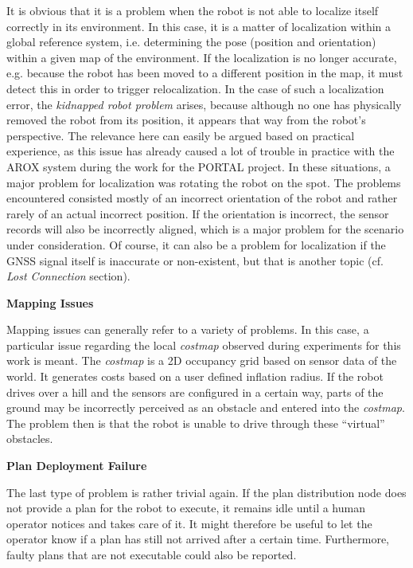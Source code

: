 \documentclass[english, master, utf8]{base/thesis_KBS}
\begin{document}
\noindent
It is obvious that it is a problem when the robot is not able to localize itself correctly in its environment.
In this case, it is a matter of localization within a global reference system, i.e. determining the pose (position and orientation) within a given map of the environment.
If the localization is no longer accurate, e.g. because the robot has been moved to a different position in the map, it must detect this in order to
trigger relocalization. In the case of such a localization error, the \textit{kidnapped robot problem} arises, because although no one has 
physically removed the robot from its position, it appears that way from the robot's perspective. \cite{Hertzberg:2012}
The relevance here can easily be argued based on practical experience, as this issue has already caused a lot of trouble in practice with the AROX system during 
the work for the PORTAL project. In these situations, a major problem for localization was rotating the robot on the spot.
The problems encountered consisted mostly of an incorrect orientation of the robot and rather rarely of an actual incorrect position.
If the orientation is incorrect, the sensor records will also be incorrectly aligned, which is a major problem for the scenario under consideration.
Of course, it can also be a problem for localization if the GNSS signal itself is inaccurate or non-existent, but that is another topic (cf. \textit{Lost Connection} section).\newline

\noindent
\textbf{Mapping Issues}\newline

\noindent
Mapping issues can generally refer to a variety of problems. In this case, a particular issue regarding the local \textit{costmap} observed during experiments for this work is meant.
The \textit{costmap} is a 2D occupancy grid based on sensor data of the world. It generates costs based on a user defined inflation radius.
If the robot drives over a hill and the sensors are configured in a certain way, parts of the ground may be incorrectly perceived as an obstacle and entered into the \textit{costmap}.
The problem then is that the robot is unable to drive through these ``virtual'' obstacles. \newline

\noindent
\textbf{Plan Deployment Failure}\newline

\noindent
The last type of problem is rather trivial again. If the plan distribution node does not provide a plan for the robot to execute, it remains idle until a human operator 
notices and takes care of it. It might therefore be useful to let the operator know if a plan has still not arrived after a certain time.
Furthermore, faulty plans that are not executable could also be reported.\newline
\end{document}
